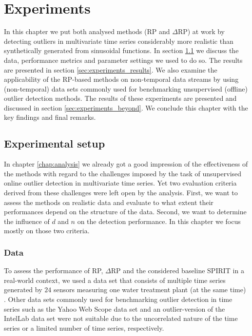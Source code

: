 \chapter{Experiments}
\label{chap:experiments}

In this chapter we put both analysed methods (RP and $\Delta$RP) at work by detecting outliers in multivariate time series considerably more realistic than synthetically generated from sinusoidal functions. In section \ref{sec:experiments_setup} we discuss the data, performance metrics and parameter settings we used to do so. The results are presented in section \ref{sec:experiments_results}. We also examine the applicability of the RP-based methods on non-temporal data streams by using (non-temporal) data sets commonly used for benchmarking unsupervised (offline) outlier detection methods. The results of these experiments are presented and discussed in section \ref{sec:experiments_beyond}. We conclude this chapter with the key findings and final remarks.

\section{Experimental setup}
\label{sec:experiments_setup}

In chapter \ref{chap:analysis} we already got a good impression of the effectiveness of the methods with regard to the challenges imposed by the task of unsupervised online outlier detection in multivariate time series. Yet two evaluation criteria derived from these challenges were left open by the analysis. First, we want to assess the methods on realistic data and evaluate to what extent their performances depend on the structure of the data. Second, we want to determine the influence of $d$ and $n$ on the detection performance. In this chapter we focus mostly on those two criteria.

\subsection{Data}
To assess the performance of RP, $\Delta$RP and the considered baseline SPIRIT in a real-world context, we used a data set that consists of multiple time series generated by $24$ sensors measuring one water treatment plant (at the same time) \cite{goh2016dataset}. Other data sets commonly used for benchmarking outlier detection in time series such as the Yahoo Web Scope data set \cite{yahoo2015s5} and an outlier-version of the IntelLab data set \cite{bruijn2016benchmark} were not suitable due to the uncorrelated nature of the time series or a limited number of time series, respectively.

